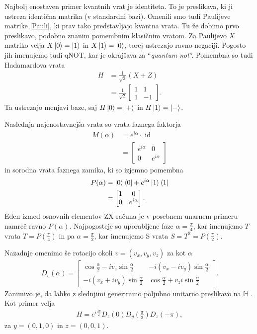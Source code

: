 \documentclass[mat1]{fmfdelo}
\newcommand{\Hb}{\mathbb H}
\DeclareMathOperator*{\id}{id}
\begin{document}
Najbolj enostaven primer kvantnih vrat je identiteta. To je preslikava, ki ji ustreza identična matrika (v standardni bazi). Omenili smo tudi Paulijeve matrike \ref{Pauli}, ki prav tako predstavljajo kvantna vrata. Tu že dobimo prvo preslikavo, podobno znanim pomembnim klasičnim vratom. Za Paulijevo \(X\) matriko velja \(X\ket0=\ket1\) in \(X\ket1=\ket0\), torej ustrezajo ravno negaciji. Pogosto jih imenujemo tudi qNOT, kar je okrajšava za ``\emph{quantum not}''. Pomembna so tudi Hadamardova vrata
\begin{align*}
    H &= \frac{1}{\sqrt{2}}(X+Z)\\
      &= \frac{1}{\sqrt2} \begin{bmatrix}
        1&1\\1&-1
    \end{bmatrix}.
\end{align*}
Ta ustrezajo menjavi baze, saj \(H\ket0=\ket+\) in \(H\ket1=\ket-\). 

Naslednja najenostavnejša vrata so vrata faznega faktorja
\begin{align*}
    M(\alpha) &= e^{i\alpha}\cdot \id\\
              &= \begin{bmatrix}
                  e^{i\alpha}&0\\
                  0&e^{i\alpha}
              \end{bmatrix}
\end{align*}
in sorodna vrata faznega zamika, ki so izjemno pomembna
\begin{align*}
    P(\alpha) &= \ket0\bra0 + e^{i\alpha}\ket1\bra1\\
              &= \begin{bmatrix}
                  1&0\\
                  0&e^{i\alpha}
              \end{bmatrix}.
\end{align*}
Eden izmed osnovnih elementov ZX računa je v posebnem unarnem primeru namreč ravno \(P(\alpha)\). Najpogosteje so uporabljene faze \(\alpha=\frac\pi4\), kar imenujemo \(T\) vrata \(T=P(\frac\pi4)\) in pa \(\alpha=\frac\pi2\), kar imenujemo S vrata \(S = T^2=P(\frac\pi2)\).

Nazadnje omenimo še rotacijo okoli \(v=(v_x,v_y,v_z)\) za kot \(\alpha\)
\begin{align*}
    D_v(\alpha) = \begin{bmatrix}
        \cos\frac\alpha2 - iv_z\sin\frac\alpha2 & -i(v_x-iv_y)\sin\frac\alpha2\\
        -i(v_x+iv_y)\sin\frac\alpha2 & \cos\frac\alpha2 + v_zi\sin\frac\alpha2
    \end{bmatrix}.
\end{align*}
Zanimivo je, da lahko z slednjimi generiramo poljubno unitarno preslikavo na \(\Hb\) \cite[Lema 2.35]{mathforqm}. Kot primer velja 
\begin{align*}
    H = e^{i\frac{3\pi}{2}}D_z(0)D_y\left(\frac\pi2\right)D_z(-\pi),
\end{align*}
za \(y=(0,1,0)\) in \(z=(0,0,1)\).
\end{document}
